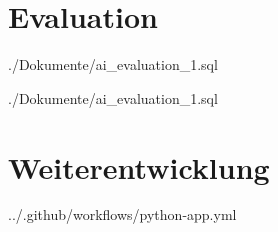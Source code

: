 \section{Evaluation}
\label{sec:anhang-evaluation}


{./Dokumente/ai_evaluation_1.sql}
\clearpage


{./Dokumente/ai_evaluation_1.sql}
\clearpage

\section{Weiterentwicklung}
\label{sec:anhang-weiterentwicklung}

\begin{minipage}{\textwidth}
	
	{../.github/workflows/python-app.yml}
\end{minipage}
\clearpage
